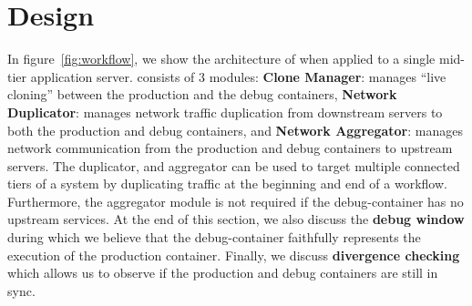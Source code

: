  \section{Design}
\label{sec:design}

In figure~\ref{fig:workflow}, we show the architecture of \parikshan when applied to a single mid-tier application server.
\parikshan consists of 3 modules: 
\textbf{Clone Manager}: manages ``live cloning'' between the production and the debug containers, 
\textbf{Network Duplicator}: manages network traffic duplication from downstream servers to both the production and debug containers, 
and \textbf{Network Aggregator}: manages network communication from the production and debug containers to upstream servers.
The duplicator, and aggregator can be used to target multiple connected tiers of a system by duplicating traffic at the beginning and end of a workflow.
Furthermore, the aggregator module is not required if the debug-container has no upstream services. 
At the end of this section, we also discuss the \textbf{debug window} during which we believe that the debug-container faithfully represents the execution of the production container.
Finally, we discuss \textbf{divergence checking} which allows us to observe if the production and debug containers are still in sync.


